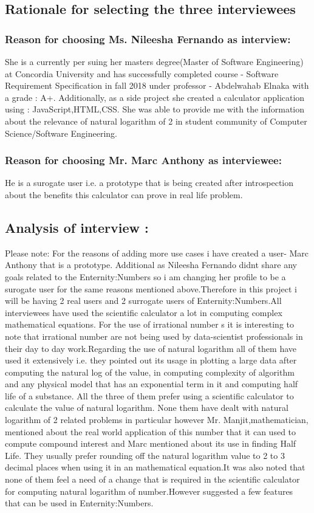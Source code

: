 \documentclass[12pt]{article}
\begin{document}
\subsection{Rationale for selecting the three interviewees}
\subsubsection{Reason for choosing Ms. Nileesha Fernando as interview:}
She is a currently per suing her masters degree(Master of Software Engineering) at Concordia University and has successfully completed course - Software Requirement Specification in fall 2018 under professor - Abdelwahab Elnaka with a grade : A+. Additionally, as a side project she created a calculator application using : JavaScript,HTML,CSS.
She was able to provide me with the information about the relevance of natural logarithm of 2 in student community of Computer Science/Software Engineering.

\subsubsection{Reason for choosing Mr. Marc Anthony as interviewee:}
He is a surogate user i.e. a prototype that is being created after introspection about the benefits this calculator can prove in real life problem.
\subsection{Analysis of interview :}

Please note: For the reasons of adding more use cases i have created a user- Marc Anthony that is a prototype.
Additional as Nileesha Fernando didnt share any goals related to the Enternity:Numbers so i am changing her profile to be a surogate user for the same reasons mentioned above.Therefore in this project i will be having 2 real users and 2 surrogate users of Enternity:Numbers.All interviewees have used the scientific calculator a lot in computing complex mathematical equations.
For the use of irrational number s it is interesting to note that irrational number are not being used by  data-scientist professionals in their day to day work.Regarding the use of natural logarithm all of them have used it extensively i.e. they pointed out its usage in plotting a large data after computing the natural log of the value, in computing complexity of algorithm and any physical model that has an exponential term in it and computing half life of a substance. All the three of them prefer using a scientific calculator to calculate the value of natural logarithm.
 None them have dealt with natural logarithm of 2 related problems in particular however Mr. Manjit,mathematician, mentioned about the real world application of this number that it can used to compute compound interest and Marc mentioned about its use in finding Half Life. They usually prefer rounding off the natural logarithm value to 2 to 3 decimal places when using it in an mathematical equation.It was also noted that none of them feel a need of a change that is required in the scientific calculator for computing natural logarithm of number.However suggested a few features that can be used in Enternity:Numbers.
\end{document}
